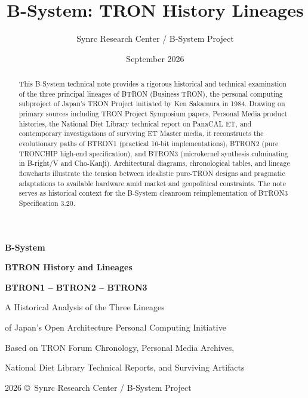 \documentclass{article}
\title{B-System: TRON History Lineages}
\author{Synrc Research Center / B-System Project}
\date{September 2026}
\newcommand\HUGE[1]{\fontsize{40}{40}\selectfont #1}
\begin{document}
\begin{titlepage}
  \AddToShipoutPictureBG*{\AtPageLowerLeft{\color{nato}\rule{\paperwidth}{\paperheight}}}
  \color{white}\thispagestyle{empty}\vspace*{2.5cm}\centering
  {\Huge \textbf{B-System} \par} \vspace{1.2cm}
  {\HUGE \textbf{BTRON History and Lineages} \par} \vspace{1.5cm}
  {\LARGE \textbf{BTRON1 -- BTRON2 -- BTRON3} \par} \vspace{1.5cm}
  {\large A Historical Analysis of the Three Lineages \par}
  {\large of Japan's Open Architecture Personal Computing Initiative \par} \vspace{1cm}
  {\large Based on TRON Forum Chronology, Personal Media Archives, \par}
  {\large National Diet Library Technical Reports, and Surviving Artifacts \par}
  \vfill
  {\large 2026 \copyright\ Synrc Research Center / B-System Project \par}
\end{titlepage}

\newpage
\maketitle

\begin{abstract}
This B-System technical note provides a rigorous historical and technical examination of the three principal lineages of BTRON (Business TRON), the personal computing subproject of Japan's TRON Project initiated by Ken Sakamura in 1984. Drawing on primary sources including TRON Project Symposium papers, Personal Media product histories, the National Diet Library technical report on PanaCAL ET, and contemporary investigations of surviving ET Master media, it reconstructs the evolutionary paths of BTRON1 (practical 16-bit implementations), BTRON2 (pure TRONCHIP high-end specification), and BTRON3 (microkernel synthesis culminating in B-right/V and Cho-Kanji). Architectural diagrams, chronological tables, and lineage flowcharts illustrate the tension between idealistic pure-TRON designs and pragmatic adaptations to available hardware amid market and geopolitical constraints. The note serves as historical context for the B-System cleanroom reimplementation of BTRON3 Specification 3.20.
\end{abstract}
\end{document}
